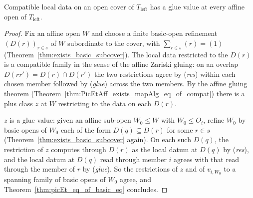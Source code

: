 \begin{theorem}
  \label{thm:picEt_exists_isGlueValue}
  \leanok
  Compatible local data on an open cover of \(T_{\mathrm{left}}\) has a glue value at every
  affine open of \(T_{\mathrm{left}}\).
\end{theorem}
\begin{proof}
  \leanok
  Fix an affine open \(W\) and choose a finite basic-open refinement \((D(r))_{r \in s}\) of
  \(W\) subordinate to the cover, with \(\sum_{r \in s}(r) = (1)\)
  (Theorem~\ref{thm:exists_basic_subcover}). The local data restricted to the \(D(r)\) is a
  compatible family in the sense of the affine Zariski gluing: on an overlap
  \(D(rr') = D(r) \cap D(r')\) the two restrictions agree by (\emph{res}) within each
  chosen member followed by (\emph{glue}) across the two members. By the affine gluing
  theorem (Theorem~\ref{thm:PicEtAff_exists_mapAlg_eq_of_compat}) there is a plus class
  \(z\) at \(W\) restricting to the data on each \(D(r)\).

  \(z\) is a glue value: given an affine sub-open \(W_0 \le W\) with \(W_0 \le O_i\), refine
  \(W_0\) by basic opens of \(W_0\) each of the form \(D(q) \subseteq D(r)\) for some
  \(r \in s\) (Theorem~\ref{thm:exists_basic_subcover} again). On each such \(D(q)\), the
  restriction of \(z\) computes through \(D(r)\) as the local datum at \(D(q)\) by
  (\emph{res}), and the local datum at \(D(q)\) read through member \(i\) agrees with that
  read through the member of \(r\) by (\emph{glue}). So the restrictions of \(z\) and of
  \(v_{i,W_0}\) to a spanning family of basic opens of \(W_0\) agree, and
  Theorem~\ref{thm:picEt_eq_of_basic_eq} concludes.
\end{proof}

